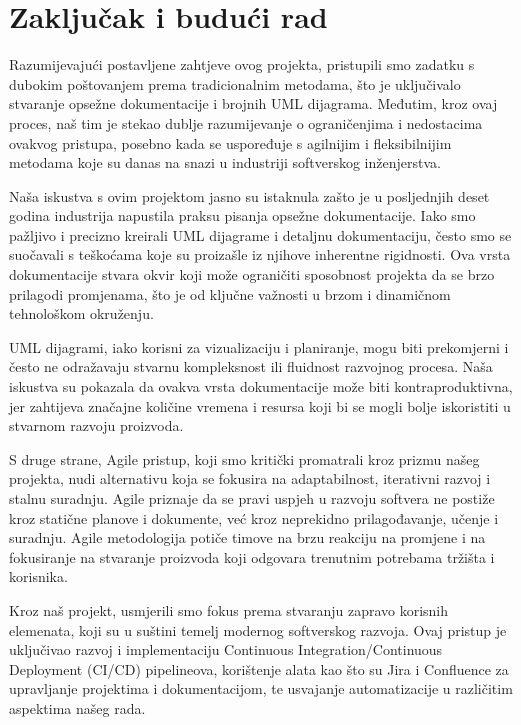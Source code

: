 \chapter{Zaključak i budući rad}
		
		Razumijevajući postavljene zahtjeve ovog projekta, 
		pristupili smo zadatku s dubokim poštovanjem prema tradicionalnim 
		metodama, što je uključivalo stvaranje opsežne dokumentacije 
		i brojnih UML dijagrama. Međutim, kroz ovaj proces, naš tim je stekao dublje razumijevanje o ograničenjima i nedostacima ovakvog pristupa, posebno kada se uspoređuje s agilnijim i fleksibilnijim metodama koje su danas na snazi u industriji softverskog inženjerstva.
		
		Naša iskustva s ovim projektom jasno su istaknula zašto je u posljednjih deset godina industrija napustila praksu pisanja opsežne dokumentacije. Iako smo pažljivo i precizno kreirali UML dijagrame i detaljnu dokumentaciju, često smo se suočavali s teškoćama koje su proizašle iz njihove inherentne rigidnosti. Ova vrsta dokumentacije stvara okvir koji može ograničiti sposobnost projekta da se brzo prilagodi promjenama, što je od ključne važnosti u brzom i dinamičnom tehnološkom okruženju.
		
		UML dijagrami, iako korisni za vizualizaciju i planiranje, mogu biti prekomjerni i često ne odražavaju stvarnu kompleksnost ili fluidnost razvojnog procesa. Naša iskustva su pokazala da ovakva vrsta dokumentacije može biti kontraproduktivna, jer zahtijeva značajne količine vremena i resursa koji bi se mogli bolje iskoristiti u stvarnom razvoju proizvoda.
		
		S druge strane, Agile pristup, koji smo kritički promatrali kroz prizmu našeg projekta, nudi alternativu koja se fokusira na adaptabilnost, iterativni razvoj i stalnu suradnju. Agile priznaje da se pravi uspjeh u razvoju softvera ne postiže kroz statične planove i dokumente, već kroz neprekidno prilagođavanje, učenje i suradnju. Agile metodologija potiče timove na brzu reakciju na promjene i na fokusiranje na stvaranje proizvoda koji odgovara trenutnim potrebama tržišta i korisnika.
		
		Kroz naš projekt, usmjerili smo fokus prema stvaranju zapravo korisnih elemenata, koji su u suštini temelj modernog softverskog razvoja. Ovaj pristup je uključivao razvoj i implementaciju Continuous Integration/Continuous Deployment (CI/CD) pipelineova, korištenje alata kao što su Jira i Confluence za upravljanje projektima i dokumentacijom, te usvajanje automatizacije u različitim aspektima našeg rada.

